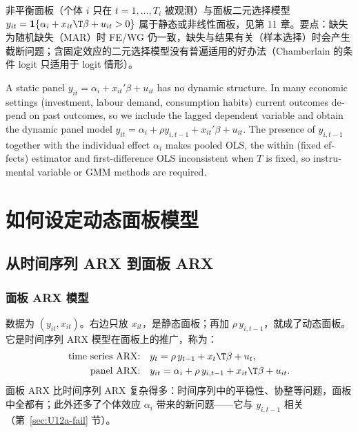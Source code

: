 \begin{note}
非平衡面板（个体 $i$ 只在 $t=1,\dots,T_i$ 被观测）与面板二元选择模型 $y_{it}=\mathbf{1}\{\alpha_i+x_{it}\T\beta+u_{it}>0\}$ 属于静态或非线性面板，见第 11 章。要点：缺失为随机缺失（MAR）时 FE/WG 仍一致，缺失与结果有关（样本选择）时会产生截断问题；含固定效应的二元选择模型没有普遍适用的好办法（Chamberlain 的条件 logit 只适用于 logit 情形）。
\end{note}

\begin{english}
A static panel $y_{it}=\alpha_i+x_{it}'\beta+u_{it}$ has no dynamic structure. In many economic settings (investment, labour demand, consumption habits) current outcomes depend on past outcomes, so we include the lagged dependent variable and obtain the dynamic panel model $y_{it}=\alpha_i+\rho y_{i,t-1}+x_{it}'\beta+u_{it}$. The presence of $y_{i,t-1}$ together with the individual effect $\alpha_i$ makes pooled OLS, the within (fixed effects) estimator and first-difference OLS inconsistent when $T$ is fixed, so instrumental variable or GMM methods are required.
\end{english}

\section{如何设定动态面板模型}\label{sec:U12a-spec}

\subsection{从时间序列 ARX 到面板 ARX}

\subsubsection{面板 ARX 模型}

数据为 $(y_{it},x_{it})$。右边只放 $x_{it}$，是静态面板；再加 $\rho\,y_{i,t-1}$，就成了动态面板。它是时间序列 ARX 模型在面板上的推广，称为：
\begin{align*}
\text{time series ARX:}\quad & y_t=\rho\,y_{t-1}+x_t\T\beta+u_t,\\
\text{panel ARX:}\quad & y_{it}=\alpha_i+\rho\,y_{i,t-1}+x_{it}\T\beta+u_{it}.
\end{align*}
面板 ARX 比时间序列 ARX 复杂得多：时间序列中的平稳性、协整等问题，面板中全都有；此外还多了个体效应 $\alpha_i$ 带来的新问题——它与 $y_{i,t-1}$ 相关（第~\ref{sec:U12a-fail} 节）。

